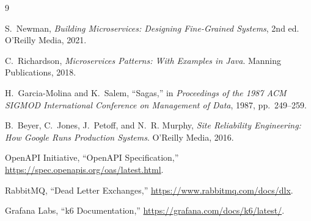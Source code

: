 \begin{thebibliography}{9}
\small

S.~Newman, \textit{Building Microservices: Designing Fine-Grained Systems}, 2nd ed. O'Reilly Media, 2021.

C.~Richardson, \textit{Microservices Patterns: With Examples in Java}. Manning Publications, 2018.

H.~Garcia-Molina and K.~Salem, ``Sagas,'' in \textit{Proceedings of the 1987 ACM SIGMOD International Conference on Management of Data}, 1987, pp.~249--259.

B.~Beyer, C.~Jones, J.~Petoff, and N.~R. Murphy, \textit{Site Reliability Engineering: How Google Runs Production Systems}. O'Reilly Media, 2016.

OpenAPI Initiative, ``OpenAPI Specification,'' \url{https://spec.openapis.org/oas/latest.html}.

RabbitMQ, ``Dead Letter Exchanges,'' \url{https://www.rabbitmq.com/docs/dlx}.

Grafana Labs, ``k6 Documentation,'' \url{https://grafana.com/docs/k6/latest/}.

\end{thebibliography}
